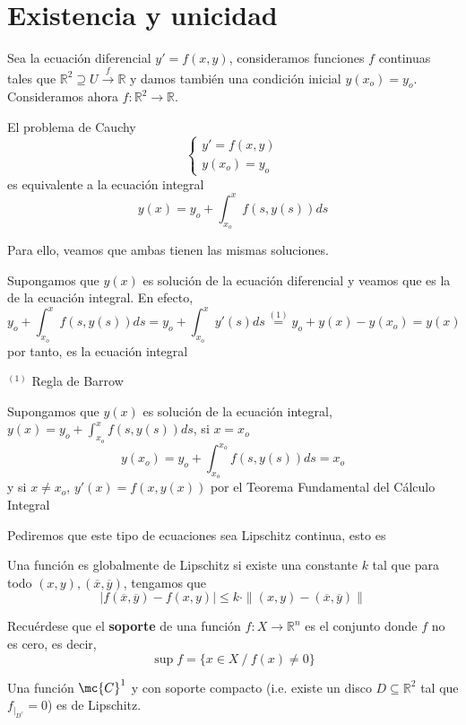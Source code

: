 \chapter{Existencia y unicidad}
Sea la ecuación diferencial $y'=f(x,y)$, consideramos funciones $f$ continuas tales que $\mathbb R^2 \supseteq U \overset{f}{\longrightarrow} \mathbb R$ y damos también una condición inicial $y(x_o)=y_o$. Consideramos ahora \; $f:\mathbb R^2 \longrightarrow \mathbb R$. 
\begin{prop}
    El problema de Cauchy $$\left\{\begin{array}{l}
         y'=f(x,y)  \\
         y(x_o)=y_o
    \end{array} \right.$$
    es equivalente a la ecuación integral $$y(x)=y_o+\int_{x_o}^x f(s,y(s)) ds$$
\end{prop}
\begin{dem}
    Para ello, veamos que ambas tienen las mismas soluciones. 

    Supongamos que $y(x)$ es solución de la ecuación diferencial y veamos que es la de la ecuación integral. En efecto, $$y_o+\int_{x_o}^x f(s,y(s)) ds=y_o+\int_{x_o}^x y'(s) ds \overset{(1)}{=} y_o+y(x)-y(x_o)=y(x)$$
    por tanto, es la ecuación integral
    
$^{(1)}$ Regla de Barrow

Supongamos que $y(x)$ es solución de la ecuación integral, $y(x)=y_o+\int_{x_o}^x f(s,y(s)) ds$, si $x=x_o$
$$y(x_o)=y_o+\int_{x_o}^{x_o}f(s,y(s))ds=x_o$$
y si $x \neq x_o$, $y'(x)=f(x,y(x))$ por el Teorema Fundamental del Cálculo Integral
    
\end{dem}
Pediremos que este tipo de ecuaciones sea Lipschitz continua, esto es
\begin{defi}
    Una función es globalmente de Lipschitz si existe una constante $k$ tal que para todo $(x,y), (\overline{x}, \overline{y})$, tengamos que
    $$|f(\overline{x}, \overline{y})-f(x,y)|\leq k \cdot \|(x,y)-(\overline{x}, \overline{y})\|$$
\end{defi}
\begin{defi}
    Recuérdese que el \textbf{soporte} de una función $f: X \longrightarrow \mathbb R^n$ es el conjunto donde $f$ no es cero, es decir, 
    $$\sup f=\{x \in X \: / \: f(x) \neq 0\}$$
\end{defi}
\begin{eje}
    Una función $\mc{C}^1$ y con soporte compacto (i.e. existe un disco $D \subseteq \mathbb R^2$ tal que $f_{|_{D^c}}=0$) es de Lipschitz.
\end{eje}

